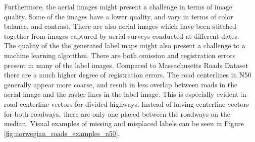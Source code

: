 Furthermore, the aerial images might present a challenge in terms of image quality. Some of the images have a lower quality, and vary in terms of color balance, and contrast. There are also aerial images which have been stitched together from images captured by aerial surveys conducted at different dates. \\  

The quality of the the generated label maps might also present a challenge to a machine learning algorithm. There are both omission and registration errors present in many of the label images. Compared to Massachusetts Roads Dataset there are a much higher degree of registration errors. The road centerlines in N50 generally appear more coarse, and result in less overlap between roads in the aerial image and the raster lines in the label image. This is especially evident in road centerline vectors for divided highways. Instead of having centerline vectors for both roadways, there are only one placed between the roadways on the median. Visual examples of missing and misplaced labels can be seen in Figure \ref{fig:norwegian_roads_examples_n50}.\\

